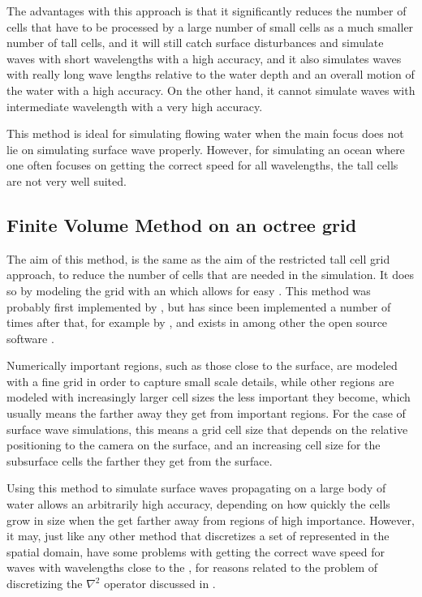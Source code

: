 The advantages with this approach is that it significantly reduces the number of cells that have to be processed by \approximating a large number of small cells as a much smaller number of tall cells, and it will still catch surface disturbances and simulate waves with short wavelengths with a high accuracy, and it also simulates waves with really long wave lengths relative to the water depth and an overall motion of the water with a high accuracy. On the other hand, it cannot simulate waves with intermediate wavelength with a very high accuracy.

This method is ideal for simulating flowing water when the main focus does not lie on simulating surface wave properly. However, for simulating an ocean where one often focuses on getting the correct speed for all wavelengths, the tall cells are not very well suited.

\subsection{Finite Volume Method on an octree grid}

The aim of this method, is the same as the aim of the restricted tall cell grid approach, to reduce the number of cells that are needed in the simulation. It does so by modeling the grid with an \octree which allows for easy . This method was probably first implemented by \citet{Popinet2003}, but has since been implemented a number of times after that, for example by \citet{Losasso2004}, and exists in among other the open source software \OpenFOAM.

Numerically important regions, such as those close to the surface, are modeled with a fine grid in order to capture small scale details, while other regions are modeled with increasingly larger cell sizes the less important they become, which usually means the farther away they get from important regions. For the case of surface wave simulations, this means a grid cell size that depends on the relative positioning to the camera on the surface, and an increasing cell size for the subsurface cells the farther they get from the surface.

Using this method to simulate surface waves propagating on a large body of water allows an arbitrarily high accuracy, depending on how quickly the cells grow in size when the get farther away from regions of high importance. However, it may, just like any other method that discretizes a set of \PDEs represented in the spatial domain, have some problems with getting the correct wave speed for waves with wavelengths close to the , for reasons related to the problem of discretizing the $\nabla^2$ operator discussed in .

